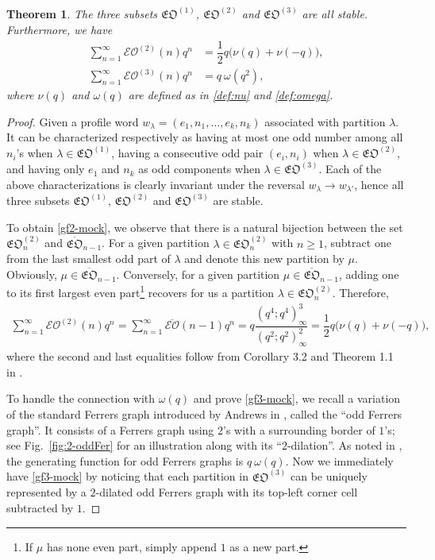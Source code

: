 \documentclass[12pt,reqno]{amsart}
\numberwithin{equation}{section}
\theoremstyle{plain}
\newtheorem{theorem}{Theorem}[section]
\theoremstyle{definition}
\def\fEO{\mathfrak{EO}}
\begin{document}
\begin{theorem}\label{thm:mock-theta}
The three subsets $\fEO^{(1)}$, $\fEO^{(2)}$ and $\fEO^{(3)}$ are all stable. Furthermore, we have
\begin{align}
\sum_{n=1}^\infty\mathcal{EO}^{(2)}(n)q^n &=\dfrac{1}{2}q\big(\nu(q)+\nu(-q)\big),\label{gf2-mock}\\
\sum_{n=1}^\infty\mathcal{EO}^{(3)}(n)q^n &=q\!\:\omega(q^2),\label{gf3-mock}
\end{align}
where $\nu(q)$ and $\omega(q)$ are defined as in \eqref{def:nu} and \eqref{def:omega}.
\end{theorem}

\begin{proof}
Given a profile word $w_{\lambda}=(e_1,n_1,\ldots,e_k,n_k)$ associated with partition $\lambda$. It can be
characterized respectively as having at most one odd number among all $n_i$'s when $\lambda\in\fEO^{(1)}$,
having a consecutive odd pair $(e_i,n_i)$ when $\lambda\in\fEO^{(2)}$, and having only $e_1$ and $n_k$ as
odd components when $\lambda\in\fEO^{(3)}$. Each of the above characterizations is clearly invariant under
the reversal $w_{\lambda}\to w_{\lambda'}$, hence all three subsets $\mathfrak{EO}^{(1)}$,
$\mathfrak{EO}^{(2)}$ and $\mathfrak{EO}^{(3)}$ are stable.

To obtain \eqref{gf2-mock}, we observe that there is a natural bijection between the set
$\mathfrak{EO}^{(2)}_n$ and $\overline{\mathfrak{EO}}_{n-1}$. For a given partition
$\lambda\in\mathfrak{EO}^{(2)}_n$ with $n\ge 1$, subtract one from the last smallest odd part of $\lambda$
and denote this new partition by $\mu$. Obviously, $\mu\in\overline{\mathfrak{EO}}_{n-1}$. Conversely, for a
given partition $\mu\in\overline{\mathfrak{EO}}_{n-1}$, adding one to its first largest even
part\footnote{If $\mu$ has none even part, simply append $1$ as a new part.}
recovers for us a partition $\lambda\in\fEO^{(2)}_n$. Therefore,
\begin{align*}
\sum_{n=1}^\infty\mathcal{EO}^{(2)}(n)q^n=\sum_{n=1}^\infty\overline{\mathcal{EO}}(n-1)q^{n}
=q\dfrac{(q^4;q^4)_\infty^3}{(q^2;q^2)_\infty^2}=\dfrac{1}{2}q\big(\nu(q)+\nu(-q)\big),
\end{align*}
where the second and last equalities follow from Corollary 3.2 and Theorem 1.1 in \cite{and2}.

To handle the connection with $\omega(q)$ and prove \eqref{gf3-mock}, we recall a variation of the standard
Ferrers graph introduced by Andrews in \cite{and5}, called the ``odd Ferrers graph''. It consists of a Ferrers
graph using $2$'s with a surrounding border of $1$'s; see Fig.~\ref{fig:2-oddFer} for an illustration along
with its ``$2$-dilation''. As noted in \cite[p.~60]{and5}, the generating function for odd Ferrers graphs is
$q\!\:\omega(q)$. Now we immediately have \eqref{gf3-mock} by noticing that each partition in $\fEO^{(3)}$ can
be uniquely represented by a $2$-dilated odd Ferrers graph with its top-left corner cell subtracted by $1$.
\end{proof}
\end{document}
